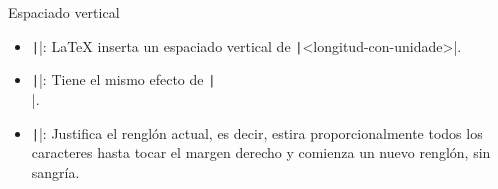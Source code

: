 \begin{frame}
\begin{block}{Espaciado vertical}
\begin{itemize}
			      \texttt|\\[<longitud-con-unidade>]|:
			      \LaTeX{} inserta un nuevo renglón con un espaciado
			      vertical de la \texttt|<longitud-con-unidade>|
			      dada.

			\item

			      \texttt|\vspace{<longitud-con-unidad>}|:
			      \LaTeX{} inserta un espaciado vertical de
			      \texttt|<longitud-con-unidade>|.

			\item

			      \texttt|\newline|: Tiene el mismo efecto de
			      \texttt|\\|.

			\item

			      \texttt|\linebreak|: Justifica el renglón
			      actual, es decir, estira proporcionalmente todos los
			      caracteres hasta tocar el margen derecho y comienza un
			      nuevo renglón, sin sangría.
		\end{itemize}
	\end{block}
\end{frame}

